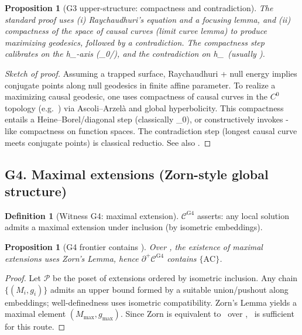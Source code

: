 \documentclass[11pt]{article}
\newtheorem{proposition}[theorem]{Proposition}
\theoremstyle{definition}
\newtheorem{definition}[theorem]{Definition}
\theoremstyle{remark}
\newcommand{\ZF}{\mathsf{ZF}}
\newcommand{\LEM}{\mathrm{LEM}}
\newcommand{\FT}{\mathrm{FT}}
\newcommand{\WKLz}{\mathrm{WKL}_0}
\newcommand{\AC}{\mathrm{AC}}
\newcommand{\Frontierpos}{\partial^{+}}
\newcommand{\hComp}{h_{\mathrm{Comp}}}
\newcommand{\hLogic}{h_{\mathrm{Logic}}}
\begin{document}
\begin{proposition}[G3 upper-structure: compactness and contradiction]\label{prop:G3-upper}
The standard proof uses (i) Raychaudhuri's equation and a focusing lemma, and (ii) compactness of the space of causal curves (limit curve lemma) to produce maximizing geodesics, followed by a contradiction. The compactness step calibrates on the \hComp-axis (\WKLz/\FT), and the contradiction on \hLogic\ (usually \LEM).
\end{proposition}

\begin{proof}[Sketch of proof]
Assuming a trapped surface, Raychaudhuri + null energy implies conjugate points along null geodesics in finite affine parameter. To realize a maximizing causal geodesic, one uses compactness of causal curves in the $C^0$ topology (e.g.\ \cite[Prop.~4.5.10]{Wald1984}) via Ascoli–Arzelà and global hyperbolicity. This compactness entails a Heine–Borel/diagonal step (classically \WKLz), or constructively invokes \FT-like compactness on function spaces. The contradiction step (longest causal curve meets conjugate points) is classical reductio. See also \cite[Ch.~8]{HawkingEllis1973}.
\end{proof}

\subsection*{G4. Maximal extensions (Zorn-style global structure)}
\begin{definition}[Witness G4: maximal extension]
$\mathcal{C}^{\mathrm{G4}}$ asserts: any local solution admits a maximal extension under inclusion (by isometric embeddings).
\end{definition}

\begin{proposition}[G4 frontier contains \AC]\label{prop:G4}
Over \ZF, the existence of maximal extensions uses Zorn's Lemma, hence $\Frontierpos\mathcal{C}^{\mathrm{G4}}$ contains $\{\AC\}$.
\end{proposition}

\begin{proof}
Let $\mathcal{P}$ be the poset of extensions ordered by isometric inclusion. Any chain $\{(M_i,g_i)\}$ admits an upper bound formed by a suitable union/pushout along embeddings; well-definedness uses isometric compatibility. Zorn's Lemma yields a maximal element $(M_{\max},g_{\max})$. Since Zorn is equivalent to \AC\ over \ZF, \AC\ is sufficient for this route.
\end{proof}
\end{document}
